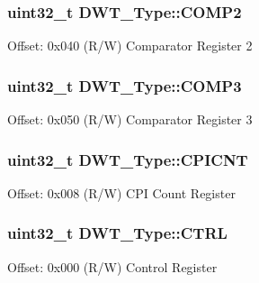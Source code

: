 \subsubsection[{\texorpdfstring{C\+O\+M\+P2}{COMP2}}]{ uint32\+\_\+t D\+W\+T\+\_\+\+Type\+::\+C\+O\+M\+P2}\hypertarget{struct_d_w_t___type_a8927aedbe9fd6bdae8983088efc83332}{}\label{struct_d_w_t___type_a8927aedbe9fd6bdae8983088efc83332}
Offset\+: 0x040 (R/W) Comparator Register 2 
\subsubsection[{\texorpdfstring{C\+O\+M\+P3}{COMP3}}]{ uint32\+\_\+t D\+W\+T\+\_\+\+Type\+::\+C\+O\+M\+P3}\hypertarget{struct_d_w_t___type_a3df15697eec279dbbb4b4e9d9ae8b62f}{}\label{struct_d_w_t___type_a3df15697eec279dbbb4b4e9d9ae8b62f}
Offset\+: 0x050 (R/W) Comparator Register 3 
\subsubsection[{\texorpdfstring{C\+P\+I\+C\+NT}{CPICNT}}]{ uint32\+\_\+t D\+W\+T\+\_\+\+Type\+::\+C\+P\+I\+C\+NT}\hypertarget{struct_d_w_t___type_a88cca2ab8eb1b5b507817656ceed89fc}{}\label{struct_d_w_t___type_a88cca2ab8eb1b5b507817656ceed89fc}
Offset\+: 0x008 (R/W) C\+PI Count Register 
\subsubsection[{\texorpdfstring{C\+T\+RL}{CTRL}}]{ uint32\+\_\+t D\+W\+T\+\_\+\+Type\+::\+C\+T\+RL}\hypertarget{struct_d_w_t___type_a37964d64a58551b69ce4c8097210d37d}{}\label{struct_d_w_t___type_a37964d64a58551b69ce4c8097210d37d}
Offset\+: 0x000 (R/W) Control Register 
